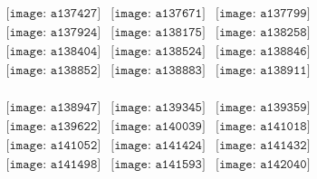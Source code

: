 \documentclass{article}
\begin{document}
        \clearpage
        \begin{figure}[H]
 \begin{center}$
 \begin{array}{cccc}
\texttt{[image: a137427]}&\texttt{[image: a137671]}&\texttt{[image: a137799]}\\\texttt{[image: a137924]}&\texttt{[image: a138175]}&\texttt{[image: a138258]}\\\texttt{[image: a138404]}&\texttt{[image: a138524]}&\texttt{[image: a138846]}\\\texttt{[image: a138852]}&\texttt{[image: a138883]}&\texttt{[image: a138911]}\\
\end{array}$
\end{center}
\end{figure}

\begin{figure}[H]
 \begin{center}$
 \begin{array}{cccc}
\texttt{[image: a138947]}&\texttt{[image: a139345]}&\texttt{[image: a139359]}\\\texttt{[image: a139622]}&\texttt{[image: a140039]}&\texttt{[image: a141018]}\\\texttt{[image: a141052]}&\texttt{[image: a141424]}&\texttt{[image: a141432]}\\\texttt{[image: a141498]}&\texttt{[image: a141593]}&\texttt{[image: a142040]}\\
\end{array}$
\end{center}
\end{figure}
\end{document}
